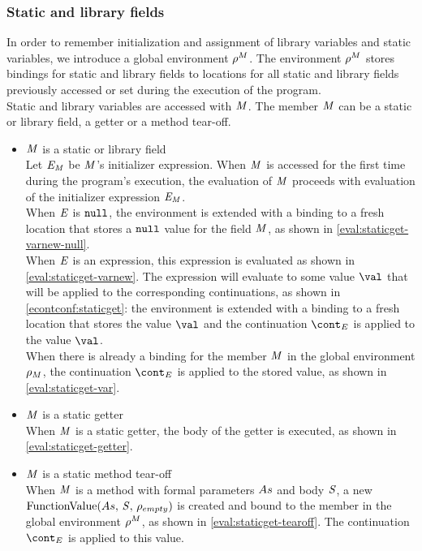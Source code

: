 \documentclass{article}
\begin{document}
\subsubsection{Static and library fields}
\label{subsubsec:static-and-library-fields}

In order to remember initialization and assignment of library variables and static variables, we introduce a global environment $\rho^{M}$. 
The environment $\rho^{M}$ stores bindings for static and library fields to locations for all static and library fields previously accessed or set during the execution of the program.\\
Static and library variables are accessed with $\mathit{M}$.
The member $\mathit{M}$ can be a static or library field, a getter or a method tear-off.
\begin{itemize}
\item $\mathit{M}$ is a static or library field\\
Let $\mathit{E}_{\mathit{M}}$ be $\mathit{M}$'s initializer expression. 
When $\mathit{M}$ is accessed for the first time during the program's execution, the evaluation of $\mathit{M}$ proceeds with evaluation of the initializer expression $\mathit{E}_{\mathit{M}}$.\\
\noindent
When $\mathit{E}$ is $\tt{null}$, the environment is extended with a binding to a fresh location that stores a $\tt{null}$ value for the field $\mathit{M}$, as shown in \eqref{eval:staticget-varnew-null}.\\
\noindent
When $\mathit{E}$ is an expression, this expression is evaluated as shown in \eqref{eval:staticget-varnew}.
The expression will evaluate to some value $\val$ that will be applied to the corresponding continuations, as shown in \eqref{econtconf:staticget}: the environment is extended with a binding to a fresh location that stores the value $\val$ and the continuation $\econt$ is applied to the value $\val$.\\
\noindent
When there is already a binding for the member $\mathit{M}$ in the global environment $\rho_{M}$, the continuation $\econt$ is applied to the stored value, as shown in \eqref{eval:staticget-var}.
\item $\mathit{M}$ is a static getter\\
\noindent
When $\mathit{M}$ is a static getter, the body of the getter is executed, as shown in \eqref{eval:staticget-getter}.
\item $\mathit{M}$ is a static method tear-off\\
\noindent
When $\mathit{M}$ is a method with formal parameters $As$ and body $\mathit{S}$, a new $\mathrm{FunctionValue}({As},\,{\mathit{S}},\,{\rho_{empty}})$ is created and bound to the member in the global environment $\rho^{M}$, as shown in \eqref{eval:staticget-tearoff}.
The continuation $\econt$ is applied to this value.
\end{itemize}
\end{document}
